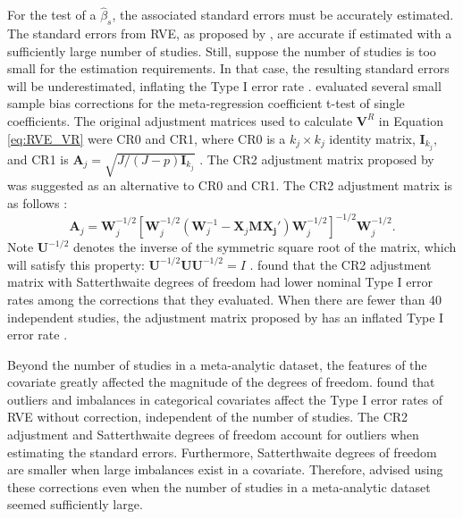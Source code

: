 For the test of a $\hat{\beta}_s$, the associated standard errors must be accurately estimated. The standard errors from RVE, as proposed by \textcite{hedges2010},  are accurate if estimated with a sufficiently large number of studies. Still, suppose the number of studies is too small for the estimation requirements.  In that case, the resulting standard errors will be underestimated, inflating the Type I error rate \autocite{tipton2015a}.   \textcite{tipton2015a} evaluated several small sample bias corrections for the meta-regression coefficient t-test of single coefficients.  The original adjustment matrices used to calculate $\mathbf{V}^R$ in Equation \ref{eq:RVE_VR} were CR0 and CR1, where CR0 is a $k_j \times k_j$ identity matrix, $\mathbf{I}_{k_j}$, and CR1 is $\mathbf{A}_j = \sqrt{J/(J-p)\mathbf{I}_{k_j}}$ \autocite{hedges2010, tipton2015a}. The CR2 adjustment matrix proposed by \textcite{mccaffrey2001} was suggested as an alternative to CR0 and CR1. The CR2 adjustment matrix is as follows \autocite[See Eq. 4 in][]{tipton2015b}:
\begin{equation}\label{adjustment}
    \mathbf{A}_j = \mathbf{W}_j^{-1/2}[\mathbf{W}_j^{-1/2}(\mathbf{W}_j^{-1}-\mathbf{X}_j\mathbf{M\mathbf{X}_j'})\mathbf{W}_j^{-1/2}]^{-1/2}\mathbf{W}_j^{-1/2}.
\end{equation}
Note $\mathbf{U}^{-1/2}$ denotes the inverse of the symmetric square root of the matrix, which will satisfy this property: $\mathbf{U}^{-1/2}\mathbf{U}\mathbf{U}^{-1/2}= I$ \autocite{tipton2015b}. \textcite{tipton2015a} found that the CR2 adjustment matrix with Satterthwaite degrees of freedom \autocite{mccaffrey2001} had lower nominal Type I error rates among the corrections that they evaluated. When there are fewer than 40 independent studies, the adjustment matrix proposed by \textcite{hedges2010} has an inflated Type I error rate \autocite{tipton2015a}.

Beyond the number of studies in a meta-analytic dataset, the features of the covariate greatly affected the magnitude of the degrees of freedom. \textcite{tipton2015a} found that outliers and imbalances in categorical covariates affect the Type I error rates of RVE without correction, independent of the number of studies. The CR2 adjustment and Satterthwaite degrees of freedom account for outliers when estimating the standard errors. Furthermore, Satterthwaite degrees of freedom are smaller when large imbalances exist in a covariate. Therefore, \textcite{tipton2015a} advised using these corrections even when the number of studies in a meta-analytic dataset seemed sufficiently large. 


